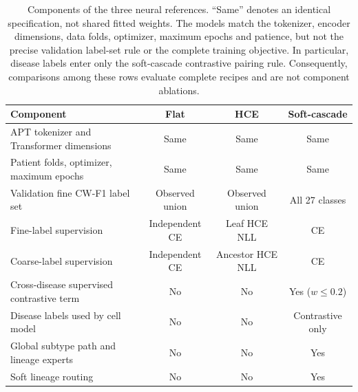 \begin{table}[H]
\centering
\small
\setlength{\tabcolsep}{3pt}
\begin{tabular}{lccc}
\toprule
Component & Flat & HCE & Soft-cascade \\
\midrule
APT tokenizer and Transformer dimensions & Same & Same & Same \\
Patient folds, optimizer, maximum epochs & Same & Same & Same \\
Validation fine CW-F1 label set & Observed union & Observed union & All 27 classes \\
Fine-label supervision & Independent CE & Leaf HCE NLL & CE \\
Coarse-label supervision & Independent CE & Ancestor HCE NLL & CE \\
Cross-disease supervised contrastive term & No & No & Yes ($w\leq0.2$) \\
Disease labels used by cell model & No & No & Contrastive only \\
Global subtype path and lineage experts & No & No & Yes \\
Soft lineage routing & No & No & Yes \\
\bottomrule
\end{tabular}
\caption{Components of the three neural references. ``Same'' denotes an
identical specification, not shared fitted weights. The models match the
tokenizer, encoder dimensions, data folds, optimizer, maximum epochs and
patience, but not the precise validation label-set rule or the complete
training objective. In particular, disease labels enter only the soft-cascade
contrastive pairing rule. Consequently, comparisons among these rows evaluate
complete recipes and are not component ablations.}
\label{tab:transformer_components}
\end{table}
